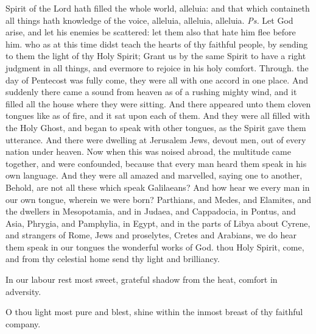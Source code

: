 \introit
{} Spirit of the Lord hath filled the whole world, alleluia: and that which containeth all things hath knowledge of the voice, alleluia, alleluia, alleluia. \textit{Ps.} Let God arise, and let his enemies be scattered: let them also that hate him flee before him.
\collect
{} who as at this time didst teach the hearts of thy faithful people, by sending to them the light of thy Holy Spirit; Grant us by the same Spirit to have a right judgment in all things, and evermore to rejoice in his holy comfort. Through.
 the day of Pentecost was fully come, they were all with one accord in one place. And suddenly there came a sound from heaven as of a rushing mighty wind, and it filled all the house where they were sitting. And there appeared unto them cloven tongues like as of fire, and it sat upon each of them. And they were all filled with the Holy Ghost, and began to speak with other tongues, as the Spirit gave them utterance. And there were dwelling at Jerusalem Jews, devout men, out of every nation under heaven. Now when this was noised abroad, the multitude came together, and were confounded, because that every man heard them speak in his own language. And they were all amazed and marvelled, saying one to another, Behold, are not all these which speak Galilaeans? And how hear we every man in our own tongue, wherein we were born? Parthians, and Medes, and Elamites, and the dwellers in Mesopotamia, and in Judaea, and Cappadocia, in Pontus, and Asia, Phrygia, and Pamphylia, in Egypt, and in the parts of Libya about Cyrene, and strangers of Rome, Jews and proselytes, Cretes and Arabians, we do hear them speak in our tongues the wonderful works of God.
\label{WhitSeq}
 thou Holy Spirit, come, and from thy celestial home send thy light and brilliancy.

In our labour rest most sweet, grateful shadow from the heat, comfort in adversity.

O thou light most pure and blest, shine within the inmost breast of thy faithful company.

